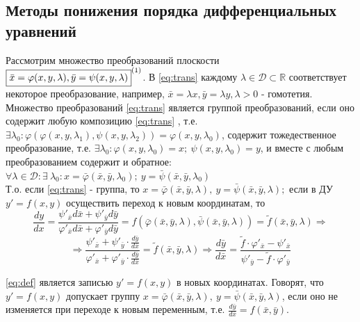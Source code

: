 \subsection{Методы понижения порядка дифференциальных уравнений}
\begin{proposition}

	Рассмотрим множество преобразований плоскости \\ $ \boxed{\bar{x} = \varphi(x,y,\lambda), \bar{y} = \psi (x,y,\lambda)}^{\eqnum\label{eq:trans}} $. В \eqref{eq:trans} каждому $ \lambda \in \mathcal{ D }  \subset \mathbb{ R } $ соответствует некоторое преобразование, например, $ \bar{x} = \lambda x, \bar{y} = \lambda y, \lambda > 0 $ - гомотетия. Множество преобразований \eqref{eq:trans}  является группой преобразований, если оно содержит любую композицию \eqref{eq:trans} , т.е. 
	$ \exists \lambda_0 : \varphi(\varphi(x,y,\lambda_1), \psi(x,y,\lambda_2)) = \varphi(x,y,\lambda_0) $, содержит тожедественное преобразование, т.е. $ \exists \lambda_0: \varphi(x,y,\lambda_0) = x; \ \psi(x,y,\lambda_0) = y $, и вместе с любым преобразованием содержит и обратное: $ \forall \lambda \in \mathcal{D} \colon  \exists \ \lambda_0 \colon x = \bar{ \varphi } (\bar{x}, \bar{y}, \lambda_0); \ y = \bar{ \psi } (\bar{x}, \bar{y}, \lambda_0) $ \\
	Т.о. если \eqref{eq:trans} - группа, то $ x = \bar{ \varphi } (\bar{x}, \bar{y}, \lambda), \ y = \bar{ \psi } (\bar{x}, \bar{y}, \lambda);$ если в ДУ $ y' = f(x,y)$ осуществить переход к новым координатам, то \\
	$$
	\frac{dy}{dx} = \frac{ \psi'_{ \bar{x} } d\bar{x} +  \psi'_{ \bar{y} } d\bar{y} }{ \varphi'_{\bar{x}} d\bar{x} +  \varphi'_{\bar{y}} d\bar{y}} = f(\bar{ \varphi }(\bar{x}, \bar{y}, \lambda), \bar{ \psi }(\bar{x}, \bar{y}, \lambda)) = \tilde{f}(\bar{x}, \bar{y}, \lambda) \Rightarrow
	$$	
	\begin{equation} \label{eq:def}
	\Rightarrow \frac{ \psi'_{ \bar{x} } + \psi'_{ \bar{y} } \cdot \frac{d\bar{y}}{d\bar{x}} }{ \varphi'_{\bar{x}} +  \varphi'_{\bar{y}} \cdot \frac{d\bar{y}}{d\bar{x}} } = \tilde{f}(\bar{x}, \bar{y}, \lambda) \Rightarrow \frac{d\bar{y}}{d\bar{x}} = \frac{\tilde{f} \cdot \varphi'_{\bar{x}} - \psi'_{\bar{x} }}{\psi'_{\bar{y}} - \tilde{f} \cdot \varphi'_{\bar{y}}}
	\end{equation}  
	
	\eqref{eq:def} является записью $ y' = f(x,y) $ в новых координатах. Говорят, что $ y' = f(x,y) $ допускает группу $ x =\bar{ \varphi }(\bar{x}, \bar{y}, \lambda), \ y = \bar{ \psi } (\bar{x}, \bar{y}, \lambda)$, если оно не изменяется при переходе к новым переменным, т.е. $ \frac{d\bar{y}}{d\bar{x}} = f(\bar{x}, \bar{y}) $.
\end{proposition}

